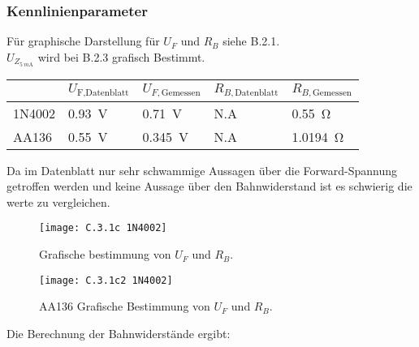 \documentclass[
	a4paper, %
	12pt, %
]{CSUniSchoolLabReport}
\newcommand{\milli}{m}
\begin{document}
\subsubsection{Kennlinienparameter}
Für graphische Darstellung für $U_F$ und $R_B$ siehe B.2.1. \\
$U_{Z_{\SI{5}{\milli\ampere}}}$ wird bei B.2.3 grafisch Bestimmt. \\

\begin{table}[H]
\centering
\begin{tabular}{l|llll}
							& $U_{\text{F,Datenblatt}}$ & $U_{F,\text{Gemessen}}$ & $R_{B,\text{Datenblatt}}$ & $R_{B,\text{Gemessen}}$ \\
\hline
1N4002                     & \SI{0.93}{\volt}                        & \SI{0.71}{\volt}                       & N.A                          & \SI{0.55}{\ohm}                         \\
\hline
AA136                      & \SI{0.55}{\volt}                        & \SI{0.345}{\volt}                      & N.A                          & \SI{1.0194}{\ohm}                       \\                       
\end{tabular}
\end{table}

Da im Datenblatt nur sehr schwammige Aussagen über die Forward-Spannung getroffen werden und keine Aussage über den Bahnwiderstand ist es schwierig die werte zu vergleichen.



\begin{figure}[H] %
	\centering %
	\texttt{[image: C.3.1c 1N4002]} %
	\caption{Grafische bestimmung von $U_F$ und $R_B$.}
\end{figure}

\begin{figure}[H] %
	\centering %
	\texttt{[image: C.3.1c2 1N4002]} %
	\caption{AA136 Grafische Bestimmung von $U_F$ und $R_B$.}
\end{figure}

\vspace{2em}

Die Berechnung der Bahnwiderstände ergibt:\\
\end{document}
